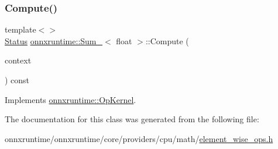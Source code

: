 \subsubsection{\texorpdfstring{Compute()}{Compute()}\hspace{0.1cm}{\footnotesize\ttfamily [2/2]}}
{\footnotesize\ttfamily template$<$$>$ \\
\mbox{\hyperlink{classonnxruntime_1_1common_1_1Status}{Status}} \mbox{\hyperlink{classonnxruntime_1_1Sum__8}{onnxruntime\+::\+Sum\+\_}}$<$ float $>$\+::Compute (\begin{DoxyParamCaption}\item[{\mbox{\hyperlink{classonnxruntime_1_1OpKernelContext}{Op\+Kernel\+Context}} $\ast$}]{context }\end{DoxyParamCaption}) const\hspace{0.3cm}{\ttfamily [virtual]}}



Implements \mbox{\hyperlink{classonnxruntime_1_1OpKernel_a9eca8656a78b1b3ab9d3351a12798650}{onnxruntime\+::\+Op\+Kernel}}.



The documentation for this class was generated from the following file\+:\begin{DoxyCompactItemize}
\item 
onnxruntime/onnxruntime/core/providers/cpu/math/\mbox{\hyperlink{element__wise__ops_8h}{element\+\_\+wise\+\_\+ops.\+h}}\end{DoxyCompactItemize}
